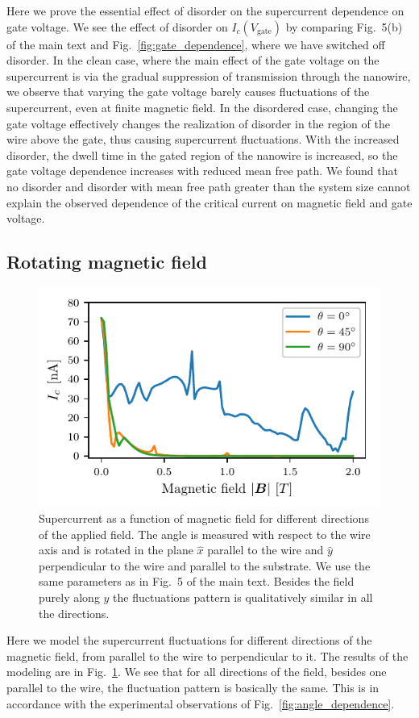 Here we prove the essential effect of disorder on the supercurrent dependence on gate voltage.
We see the effect of disorder on $I_c(V_\textrm{gate})$ by comparing Fig.~5(b) of the main text and Fig.~\ref{fig:gate_dependence}, where we have switched off disorder.
In the clean case, where the main effect of the gate voltage on the supercurrent is via the gradual suppression of transmission through the nanowire, we observe that varying the gate voltage barely causes fluctuations of the supercurrent, even at finite magnetic field.
In the disordered case, changing the gate voltage effectively changes the realization of disorder in the region of the wire above the gate, thus causing supercurrent fluctuations. With the increased disorder, the dwell time in the gated region of the nanowire is increased, so the gate voltage dependence increases with reduced mean free path.
We found that no disorder and disorder with mean free path greater than the system size cannot explain the observed dependence of the critical current on magnetic field and gate voltage.

\subsection{Rotating magnetic field}
\begin{figure}
\begin{center}
\centering
\includegraphics[width=0.7\columnwidth]{chapter_supercurrent/figures/sup_fig10}
\caption{
Supercurrent as a function of magnetic field for different directions of the applied field.
The angle is measured with respect to the wire axis and is rotated in the plane $\hat{x}$ parallel to the wire and $\hat{y}$ perpendicular to the wire and parallel to the substrate.
We use the same parameters as in Fig.~5 of the main text\label{fig:rotation_of_field}.
Besides the field purely along $\hat{y}$ the fluctuations pattern is qualitatively similar in all the directions.}
\end{center}
\end{figure}

Here we model the supercurrent fluctuations for different directions of the magnetic field, from parallel to the wire to perpendicular to it.
The results of the modeling are in Fig.~\ref{fig:rotation_of_field}.
We see that for all directions of the field, besides one parallel to the wire, the fluctuation pattern is basically the same.
This is in accordance with the experimental observations of Fig.~\ref{fig:angle_dependence}.

